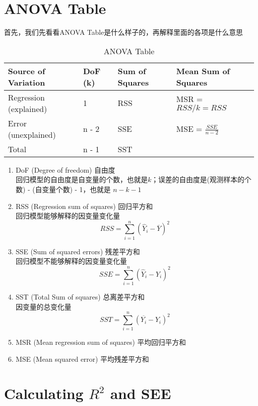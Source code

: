 \documentclass[cn,11pt,chinese]{elegantbook}
\begin{document}
\section{ANOVA Table}
    首先，我们先看看ANOVA Table是什么样子的，再解释里面的各项是什么意思
    \begin{table}[htbp]
        \centering
        \caption{ANOVA Table}
          \begin{tabular}{llll}
          \toprule
          Source of Variation & DoF (k) & Sum of Squares & Mean Sum of Squares \\
          \midrule
          Regression (explained) & 1 & RSS & MSR = \(RSS / k = RSS\)\\
          Error (unexplained) & n - 2 & SSE & MSE = \(\frac{SSE}{n - 2}\)\\
          \midrule
          Total & n - 1 & SST &   \\
          \bottomrule
          \end{tabular}%
        \label{tab:theorem-class}%
    \end{table}%

    \begin{enumerate}
        \item DoF (Degree of freedom) 自由度\\
                回归模型的自由度是自变量的个数，也就是\(k\)；误差的自由度是(观测样本的个数) - (自变量个数) - 1，也就是 \(n - k - 1\)
        \item RSS (Regression sum of squares) 回归平方和\\
                回归模型能够解释的因变量变化量 
                \[RSS = \sum_{i = 1}^n (\hat Y_i - \overline{Y})^2\]
        \item SSE (Sum of squared errors) 残差平方和\\
                回归模型不能够解释的因变量变化量 
                \[SSE = \sum_{i = 1}^n (\hat Y_i - Y_i)^2\]
        \item SST (Total Sum of squares) 总离差平方和\\
                因变量的总变化量
                \[SST = \sum_{i = 1}^n (\overline{Y_i} - Y_i)^2\]
        \item MSR (Mean regression sum of squares) 平均回归平方和
        \item MSE (Mean squared error) 平均残差平方和
    \end{enumerate}

\section{Calculating \(R^2\) and SEE}
    
\end{document}
